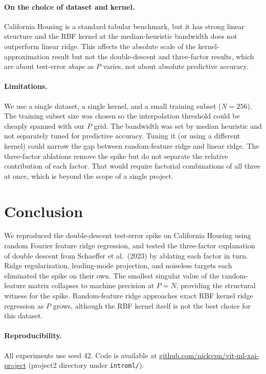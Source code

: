 \documentclass{article}
\begin{document}
\paragraph{On the choice of dataset and kernel.}
California Housing is a standard tabular benchmark, but it has strong linear structure and the RBF kernel at the median-heuristic bandwidth does not outperform linear ridge. This affects the absolute scale of the kernel-approximation result but not the double-descent and three-factor results, which are about test-error \emph{shape} as $P$ varies, not about absolute predictive accuracy.

\paragraph{Limitations.}
We use a single dataset, a single kernel, and a small training subset ($N = 256$). The training subset size was chosen so the interpolation threshold could be cheaply spanned with our $P$ grid. The bandwidth was set by median heuristic and not separately tuned for predictive accuracy. Tuning it (or using a different kernel) could narrow the gap between random-feature ridge and linear ridge. The three-factor ablations remove the spike but do not separate the relative contribution of each factor. That would require factorial combinations of all three at once, which is beyond the scope of a single project.

\section{Conclusion}

We reproduced the double-descent test-error spike on California Housing using random Fourier feature ridge regression, and tested the three-factor explanation of double descent from Schaeffer et al.\ (2023) by ablating each factor in turn. Ridge regularization, leading-mode projection, and noiseless targets each eliminated the spike on their own. The smallest singular value of the random-feature matrix collapses to machine precision at $P = N$, providing the structural witness for the spike. Random-feature ridge approaches exact RBF kernel ridge regression as $P$ grows, although the RBF kernel itself is not the best choice for this dataset.

\paragraph{Reproducibility.}
All experiments use seed 42. Code is available at \href{https://github.com/nickvpn/vit-ml-xai-project}{github.com/nickvpn/vit-ml-xai-project} (project2 directory under \texttt{introml/}).
\end{document}
